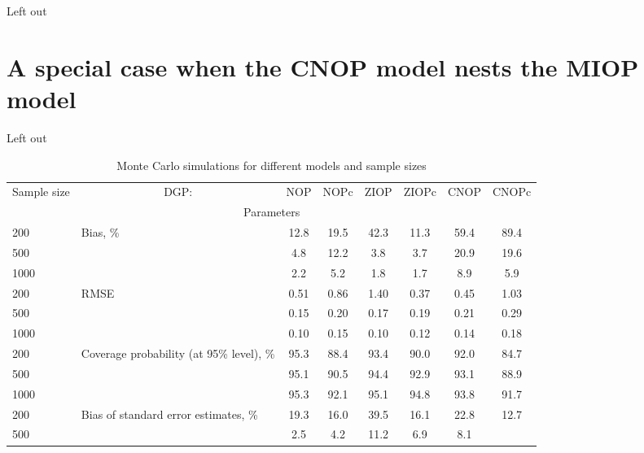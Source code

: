 \documentclass[letterpaper,fleqn,11pt]{article}
\begin{document}
Left out

\section*{\protect\Large A special case when the CNOP model nests the MIOP
model\ }

Left out


\begin{table}[htbp]
\caption{Monte Carlo simulations for different models and sample sizes}
\label{table:errors}\centering
\begin{tabular}{rrcccccc}
\toprule \toprule Sample size & \multicolumn{1}{c}{DGP:} & NOP & NOPc & ZIOP
& ZIOPc & CNOP & CNOPc \\ 
\multicolumn{8}{c}{Parameters} \\ 
\multicolumn{1}{l}{200} & \multicolumn{1}{l}{\multirow{3}[1]{*}{Bias, \%}} & 
12.8 & 19.5 & 42.3 & 11.3 & 59.4 & 89.4 \\ 
\multicolumn{1}{l}{500} & \multicolumn{1}{l}{} & 4.8 & 12.2 & 3.8 & 3.7 & 
20.9 & 19.6 \\ 
\multicolumn{1}{l}{1000} & \multicolumn{1}{l}{} & 2.2 & 5.2 & 1.8 & 1.7 & 8.9
& 5.9 \\ 
\multicolumn{1}{l}{200} & \multicolumn{1}{l}{\multirow{3}[2]{*}{RMSE}} & 0.51
& 0.86 & 1.40 & 0.37 & 0.45 & 1.03 \\ 
\multicolumn{1}{l}{500} & \multicolumn{1}{l}{} & 0.15 & 0.20 & 0.17 & 0.19 & 
0.21 & 0.29 \\ 
\multicolumn{1}{l}{1000} & \multicolumn{1}{l}{} & 0.10 & 0.15 & 0.10 & 0.12
& 0.14 & 0.18 \\ 
\multicolumn{1}{l}{200} & \multicolumn{1}{l}{\multirow{3}[2]{4cm}{Coverage
probability (at 95\% level), \%}} & 95.3 & 88.4 & 93.4 & 90.0 & 92.0 & 84.7
\\ 
\multicolumn{1}{l}{500} & \multicolumn{1}{l}{} & 95.1 & 90.5 & 94.4 & 92.9 & 
93.1 & 88.9 \\ 
\multicolumn{1}{l}{1000} & \multicolumn{1}{l}{} & 95.3 & 92.1 & 95.1 & 94.8
& 93.8 & 91.7 \\ 
\multicolumn{1}{l}{200} & \multicolumn{1}{l}{\multirow{3}[2]{4cm}{Bias of
standard error estimates, \%}} & 19.3 & 16.0 & 39.5 & 16.1 & 22.8 & 12.7 \\ 
\multicolumn{1}{l}{500} & \multicolumn{1}{l}{} & 2.5 & 4.2 & 11.2 & 6.9 & 8.1

\end{tabular}
\end{table}
\end{document}
